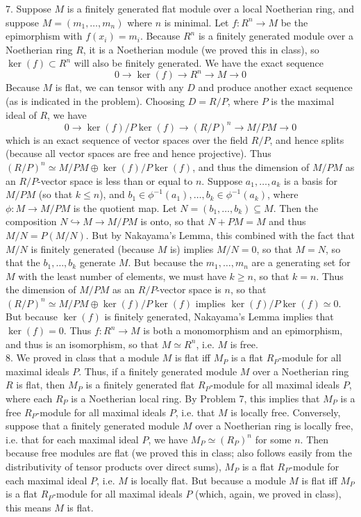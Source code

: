 \documentclass[11pt]{article}
\begin{document}
\num{7.} \rmfamily \normalsize Suppose $M$ is a finitely generated flat module over a local Noetherian ring, and suppose $M=(m_1,\ldots,m_n)$ where $n$ is minimal. Let $f:R^n\rightarrow M$ be the epimorphism with $f(x_i)=m_i$. Because $R^n$ is a finitely generated module over a Noetherian ring $R$, it is a Noetherian module (we proved this in class), so $\ker(f)\subset R^n$ will also be finitely generated. We have the exact sequence
\[0\rightarrow \ker(f)\rightarrow R^n\rightarrow M\rightarrow 0\]
Because $M$ is flat, we can tensor with any $D$ and produce another exact sequence (as is indicated in the problem). Choosing $D=R/P$, where $P$ is the maximal ideal of $R$, we have
\[0\rightarrow \ker(f)/P\ker(f)\rightarrow (R/P)^n\rightarrow M/PM\rightarrow0\]
which is an exact sequence of vector spaces over the field $R/P$, and hence splits (because all vector spaces are free and hence projective). Thus $(R/P)^n\simeq M/PM\oplus \ker(f)/P\ker(f)$, and thus the dimension of $M/PM$ as an $R/P$-vector space is less than or equal to $n$. Suppose $a_1,\ldots,a_k$ is a basis for $M/PM$ (so that $k\leq n$), and $b_1\in\phi^{-1}(a_1),\ldots,b_k\in\phi^{-1}(a_k)$, where $\phi:M\rightarrow M/PM$ is the quotient map. Let $N=(b_1,\ldots,b_k)\subseteq M$. Then the composition $N\hookrightarrow M\rightarrow M/PM$ is onto, so that $N+PM=M$ and thus $M/N=P(M/N)$. But by Nakayama's Lemma, this combined with the fact that $M/N$ is finitely generated (because $M$ is) implies $M/N=0$, so that $M=N$, so that the $b_1,\ldots,b_k$ generate $M$. But because the $m_1,\ldots,m_n$ are a generating set for $M$ with the least number of elements, we must have $k\geq n$, so that $k=n$. Thus the dimension of $M/PM$ as an $R/P$-vector space is $n$, so that $(R/P)^n\simeq M/PM\oplus \ker(f)/P\ker(f)$ implies $\ker(f)/P\ker(f)\simeq0$. But because $\ker(f)$ is finitely generated, Nakayama's Lemma implies that $\ker(f)=0$. Thus $f:R^n\rightarrow M$ is both a monomorphism and an epimorphism, and thus is an isomorphism, so that $M\simeq R^n$, i.e. $M$ is free.  \\

\num{8.} We proved in class that a module $M$ is flat iff $M_P$ is a flat $R_P$-module for all maximal ideals $P$. Thus, if a finitely generated module $M$ over a Noetherian ring $R$ is flat, then $M_P$ is a finitely generated flat $R_P$-module for all maximal ideals $P$, where each $R_P$ is a Noetherian local ring. By Problem 7, this implies that $M_P$ is a free $R_P$-module for all maximal ideals $P$, i.e. that $M$ is locally free. Conversely, suppose that a finitely generated module $M$ over a Noetherian ring is locally free, i.e. that for each maximal ideal $P$, we have $M_P\simeq (R_P)^n$ for some $n$. Then because free modules are flat (we proved this in class; also follows easily from the distributivity of tensor products over direct sums), $M_P$ is a flat $R_P$-module for each maximal ideal $P$, i.e. $M$ is locally flat. But because a module $M$ is flat iff $M_P$ is a flat $R_P$-module for all maximal ideals $P$ (which, again, we proved in class), this means $M$ is flat.      \\
\end{document}
